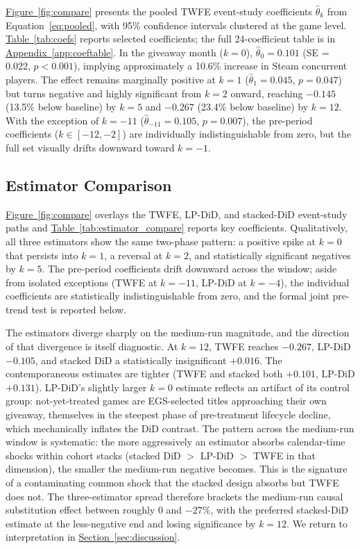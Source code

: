 \documentclass[11pt]{article}
\newcommand{\secref}[1]{\hyperref[#1]{Section~\ref*{#1}}}
\newcommand{\tabref}[1]{\hyperref[#1]{Table~\ref*{#1}}}
\newcommand{\figref}[1]{\hyperref[#1]{Figure~\ref*{#1}}}
\newcommand{\appref}[1]{\hyperref[#1]{Appendix~\ref*{#1}}}
\begin{document}
\figref{fig:compare} presents the pooled TWFE event-study
coefficients $\hat{\theta}_k$ from Equation~\eqref{eq:pooled}, with 95\%
confidence intervals clustered at the game level. \tabref{tab:coefs} reports
selected coefficients; the full 24-coefficient table is in
\appref{app:coeftable}. In the giveaway month ($k = 0$), $\hat{\theta}_0 = 0.101$
(SE = 0.022, $p < 0.001$), implying approximately a 10.6\% increase in Steam
concurrent players. The effect remains marginally positive at $k = 1$
($\hat{\theta}_1 = 0.045$, $p = 0.047$) but turns negative and highly significant
from $k = 2$ onward, reaching $-0.145$ (13.5\% below baseline) by $k = 5$ and
$-0.267$ (23.4\% below baseline) by $k = 12$. With the exception of $k = -11$
($\hat{\theta}_{-11} = 0.105$, $p = 0.007$), the pre-period coefficients
($k \in [-12, -2]$) are individually indistinguishable from zero, but the
full set visually drifts downward toward $k = -1$.

\subsection{Estimator Comparison}
\label{ssec:compare}

\figref{fig:compare} overlays the TWFE, LP-DiD, and stacked-DiD event-study
paths and \tabref{tab:estimator_compare} reports key coefficients.
Qualitatively, all three estimators show the same two-phase pattern: a positive
spike at $k = 0$ that persists into $k = 1$, a reversal at $k = 2$, and
statistically significant negatives by $k = 5$. The pre-period coefficients
drift downward across the window; aside from isolated exceptions (TWFE at
$k = -11$, LP-DiD at $k = -4$), the individual coefficients are statistically
indistinguishable from zero, and the formal joint pre-trend test is reported
below.

The estimators diverge sharply on the medium-run magnitude, and the direction
of that divergence is itself diagnostic. At $k = 12$, TWFE reaches $-0.267$,
LP-DiD $-0.105$, and stacked DiD a statistically insignificant $+0.016$. The
contemporaneous estimates are tighter (TWFE and stacked both $+0.101$, LP-DiD
$+0.131$). LP-DiD's slightly larger $k = 0$ estimate reflects an artifact of
its control group: not-yet-treated games are EGS-selected titles approaching
their own giveaway, themselves in the steepest phase of pre-treatment
lifecycle decline, which mechanically inflates the DiD contrast. The pattern
across the medium-run window is systematic: the more aggressively an estimator
absorbs calendar-time shocks within cohort stacks (stacked DiD $>$ LP-DiD $>$
TWFE in that dimension), the smaller the medium-run negative becomes. This is
the signature of a contaminating common shock that the stacked design absorbs
but TWFE does not. The three-estimator spread therefore brackets the medium-run
causal substitution effect between roughly $0$ and $-27\%$, with the preferred
stacked-DiD estimate at the less-negative end and losing significance by
$k = 12$. We return to interpretation in \secref{sec:discussion}.
\end{document}
